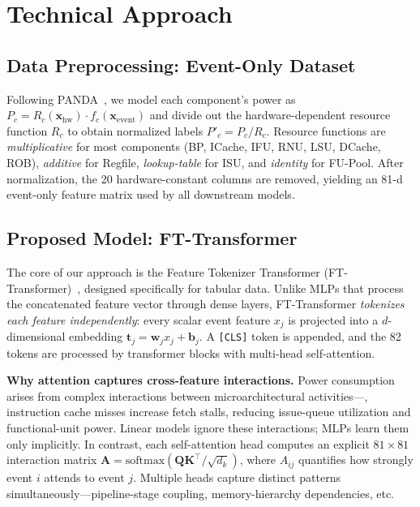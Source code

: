 \documentclass[10pt,twocolumn,letterpaper]{article}
\begin{document}
\section{Technical Approach}

\subsection{Data Preprocessing: Event-Only Dataset}
\label{sec:preproc}
Following PANDA~\cite{zhang2023panda}, we model each component's power as
$P_c = R_c(\mathbf{x}_\text{hw}) \cdot f_c(\mathbf{x}_\text{event})$ and
divide out the hardware-dependent resource function $R_c$ to obtain
normalized labels $P'_c = P_c / R_c$.  Resource functions are
\emph{multiplicative} for most components (BP, ICache, IFU, RNU, LSU,
DCache, ROB), \emph{additive} for Regfile, \emph{lookup-table} for ISU,
and \emph{identity} for FU-Pool.
After normalization, the 20 hardware-constant columns are removed, yielding
an 81-d event-only feature matrix used by all downstream models.

\subsection{Proposed Model: FT-Transformer}

The core of our approach is the Feature Tokenizer Transformer
(FT-Transformer)~\cite{gorishniy2021ft_transformer}, designed specifically
for tabular data.  Unlike MLPs that process the concatenated feature vector
through dense layers, FT-Transformer \emph{tokenizes each feature
independently}: every scalar event feature $x_j$ is projected into a
$d$-dimensional embedding $\mathbf{t}_j = \mathbf{w}_j x_j +
\mathbf{b}_j$.  A \texttt{[CLS]} token is appended, and the 82 tokens
are processed by transformer blocks with multi-head self-attention.

\noindent\textbf{Why attention captures cross-feature interactions.}
Power consumption arises from complex interactions between
microarchitectural activities---\eg, instruction cache misses increase
fetch stalls, reducing issue-queue utilization and functional-unit power.
Linear models ignore these interactions; MLPs learn them only implicitly.
In contrast, each self-attention head computes an explicit
$81\times 81$ interaction matrix
$\mathbf{A} = \text{softmax}(\mathbf{Q}\mathbf{K}^\top / \sqrt{d_k})$,
where $A_{ij}$ quantifies how strongly event $i$ attends to event $j$.
Multiple heads capture distinct patterns simultaneously---pipeline-stage
coupling, memory-hierarchy dependencies, etc.
\end{document}
